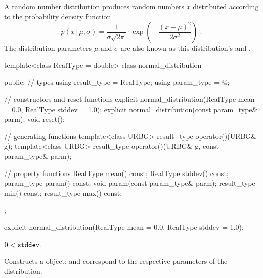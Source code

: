 \pnum
A  random number distribution
produces random numbers $x$
distributed according to
the probability density function%
%
%
\[%
 p(x\,|\,\mu,\sigma)
      = \frac{1}{\sigma \sqrt{2\pi}}
        \cdot
        \exp{\left(- \, \frac{(x - \mu)^2}
                             {2 \sigma^2}
             \right)
            }
 \text{ .}
\]
The distribution parameters $\mu$ and $\sigma$
are also known as this distribution's %
%
and %
%
%
.

%
\begin{codeblock}
template<class RealType = double>
  class normal_distribution {
  public:
    // types
    using result_type = RealType;
    using param_type  = @\unspec@;

    // constructors and reset functions
    explicit normal_distribution(RealType mean = 0.0, RealType stddev = 1.0);
    explicit normal_distribution(const param_type& parm);
    void reset();

    // generating functions
    template<class URBG>
      result_type operator()(URBG& g);
    template<class URBG>
      result_type operator()(URBG& g, const param_type& parm);

    // property functions
    RealType mean() const;
    RealType stddev() const;
    param_type param() const;
    void param(const param_type& parm);
    result_type min() const;
    result_type max() const;
  };
\end{codeblock}


%
\begin{itemdecl}
explicit normal_distribution(RealType mean = 0.0, RealType stddev = 1.0);
\end{itemdecl}

\begin{itemdescr}
\pnum
\requires $0 < \texttt{stddev}$.

\pnum
\effects Constructs a  object;
 and 
correspond to the respective parameters of the distribution.
\end{itemdescr}

